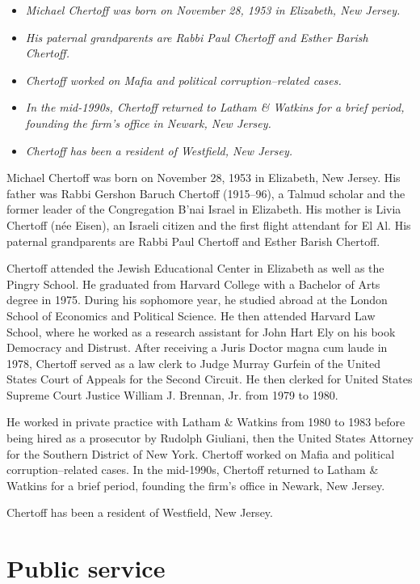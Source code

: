 \begin{itemize}
\item
  \emph{Michael Chertoff was born on November 28, 1953 in Elizabeth, New
  Jersey.}
\item
  \emph{His paternal grandparents are Rabbi Paul Chertoff and Esther
  Barish Chertoff.}
\item
  \emph{Chertoff worked on Mafia and political corruption--related
  cases.}
\item
  \emph{In the mid-1990s, Chertoff returned to Latham \& Watkins for a
  brief period, founding the firm's office in Newark, New Jersey.}
\item
  \emph{Chertoff has been a resident of Westfield, New Jersey.}
\end{itemize}

Michael Chertoff was born on November 28, 1953 in Elizabeth, New Jersey.
His father was Rabbi Gershon Baruch Chertoff (1915--96), a Talmud
scholar and the former leader of the Congregation B'nai Israel in
Elizabeth. His mother is Livia Chertoff (née Eisen), an Israeli citizen
and the first flight attendant for El Al. His paternal grandparents are
Rabbi Paul Chertoff and Esther Barish Chertoff.

Chertoff attended the Jewish Educational Center in Elizabeth as well as
the Pingry School. He graduated from Harvard College with a Bachelor of
Arts degree in 1975. During his sophomore year, he studied abroad at the
London School of Economics and Political Science. He then attended
Harvard Law School, where he worked as a research assistant for John
Hart Ely on his book Democracy and Distrust. After receiving a Juris
Doctor magna cum laude in 1978, Chertoff served as a law clerk to Judge
Murray Gurfein of the United States Court of Appeals for the Second
Circuit. He then clerked for United States Supreme Court Justice William
J. Brennan, Jr. from 1979 to 1980.

He worked in private practice with Latham \& Watkins from 1980 to 1983
before being hired as a prosecutor by Rudolph Giuliani, then the United
States Attorney for the Southern District of New York. Chertoff worked
on Mafia and political corruption--related cases. In the mid-1990s,
Chertoff returned to Latham \& Watkins for a brief period, founding the
firm's office in Newark, New Jersey.

Chertoff has been a resident of Westfield, New Jersey.

\section{Public service}\label{public-service}

